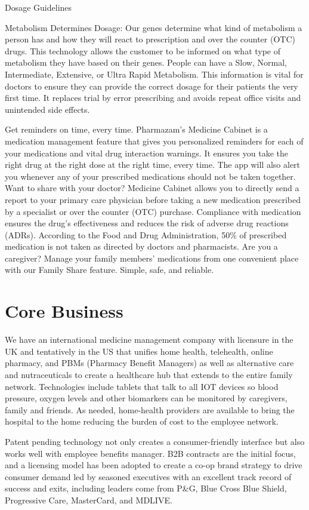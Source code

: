 \documentclass[11pt]{article}
\begin{document}
Dosage Guidelines


Metabolism Determines Dosage: Our genes determine what kind of metabolism a person has and how they will react to prescription and over the counter (OTC) drugs. This technology allows the customer to be informed on what type of metabolism they have based on their genes. People can have a Slow, Normal, Intermediate, Extensive, or Ultra Rapid Metabolism. This information is vital for doctors to ensure they can provide the correct dosage for their patients the very first time. It replaces trial by error prescribing and avoids repeat office visits and unintended side effects.


Get reminders on time, every time. Pharmazam's Medicine Cabinet is a medication management feature that gives you personalized reminders for each of your medications and vital drug interaction warnings. It ensures you take the right drug at the right dose at the right time, every time. The app will also alert you whenever any of your prescribed medications should not be taken together. Want to share with your doctor? Medicine Cabinet allows you to directly send a report to your primary care physician before taking a new medication prescribed by a specialist or over the counter (OTC) purchase. Compliance with medication ensures the drug's effectiveness and reduces the risk of adverse drug reactions (ADRs). According to the Food and Drug Administration, 50\% of prescribed medication is not taken as directed by doctors and pharmacists. Are you a caregiver? Manage your family members' medications from one convenient place with our Family Share feature. Simple, safe, and reliable.


\section{Core Business}

We have an international medicine management company with licensure in the UK and tentatively in the US that unifies home health, telehealth, online pharmacy, and PBMs (Pharmacy Benefit Managers) as well as alternative care and nutraceuticals to create a healthcare hub that extends to the entire family network. Technologies include tablets that talk to all IOT devices so blood pressure, oxygen levels and other biomarkers can be monitored by caregivers, family and friends. As needed, home-health providers are available to bring the hospital to the home reducing the burden of cost to the employee network.


Patent pending technology not only creates a consumer-friendly interface but also works well with employee benefits manager. B2B contracts are the initial focus, and a licensing model has been adopted to create a co-op brand strategy to drive consumer demand led by seasoned executives with an excellent track record of success and exits, including leaders come from P\&G, Blue Cross Blue Shield, Progressive Care, MasterCard, and MDLIVE.
\end{document}
